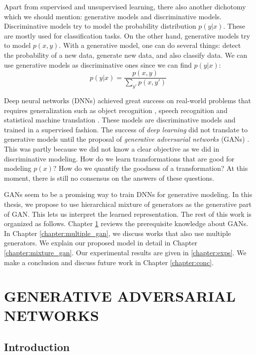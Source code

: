 \documentclass[a4paper,onesided,12pt]{report}
\begin{document}
Apart from supervised and unsupervised learning, there also another dichotomy which we should mention: generative models and discriminative models. Discriminative models try to model the probability distribution $p(y|x)$. These are mostly used for classification tasks. On the other hand, generative models try to model $p(x, y)$. With a generative model, one can do several things: detect the probability of a new data, generate new data, and also classify data. We can use generative models as discriminative ones since we can find $p(y|x)$:
\begin{equation}
p(y|x) = \frac{p(x, y)}{\sum_{y'} p(x, y')}
\end{equation}

Deep neural networks (DNNs) achieved great success on real-world problems that requires generalization such as object recognition \cite{krizhevsky2012imagenet}, speech recognition \cite{hinton2012deep} and statistical machine translation \cite{sutskever2014sequence}. These models are discriminative models and trained in a supervised fashion. The success of \emph{deep learning} did not translate to generative models until the proposal of \emph{generative adversarial networks} (GANs) \cite{gan}. This was partly because we did not know a clear objective as we did in discriminative modeling. How do we learn transformations that are good for modeling $p(x)$? How do we quantify the goodness of a transformation? At this moment, there is still no consensus on the answers of these questions.

GANs seem to be a promising way to train DNNs for generative modeling. In this thesis, we propose to use hierarchical mixture of generators as the generative part of GAN. This lets us interpret the learned representation. The rest of this work is organized as follows. Chapter \ref{chapter:gan} reviews the prerequisite knowledge about GANs. In Chapter \ref{chapter:multiple_gan}, we discuss works that also use multiple generators. We explain our proposed model in detail in Chapter \ref{chapter:mixture_gan}. Our experimental results are given in \ref{chapter:exps}. We make a conclusion and discuss future work in Chapter \ref{chapter:conc}.

\chapter{GENERATIVE ADVERSARIAL NETWORKS}
\label{chapter:gan}

\section{Introduction}
\label{sec:gan:intro}
\end{document}
